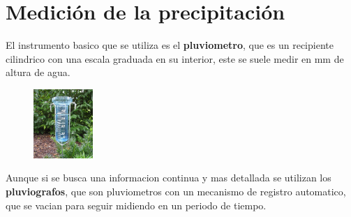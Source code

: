 \section{Medición de la precipitación}

El instrumento basico que se utiliza es el \textbf{pluviometro}, que es un recipiente cilindrico con una escala graduada en su interior, este se suele medir en mm de altura de agua.\\

\begin{figure}[h]
    \centering
    \includegraphics[width=0.2\textwidth]{imagenes/pluviometro.png}
    \label{pluviometro}
\end{figure}

Aunque si se busca una informacion continua y mas detallada se utilizan los \textbf{pluviografos}, que son pluviometros con un mecanismo de registro automatico, que se vacian para seguir midiendo en un periodo de tiempo.\\

